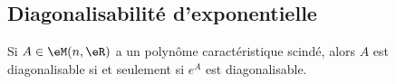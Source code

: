 \subsection{Diagonalisabilité d'exponentielle}

\begin{proposition}      \label{PropCOMNooIErskN}
	Si \( A\in \eM(n,\eR)\) a un polynôme caractéristique scindé, alors \( A\) est diagonalisable si et seulement si \( e^A\) est diagonalisable.
\end{proposition}

